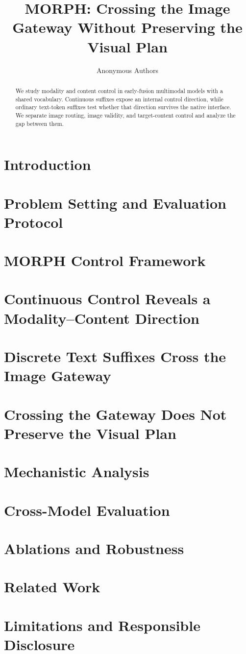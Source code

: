 \documentclass{article}
\title{MORPH: Crossing the Image Gateway Without Preserving the Visual Plan}
\author{Anonymous Authors}
\begin{document}
\maketitle
\begin{abstract}
We study modality and content control in early-fusion multimodal models with a shared vocabulary. Continuous suffixes expose an internal control direction, while ordinary text-token suffixes test whether that direction survives the native interface. We separate image routing, image validity, and target-content control and analyze the gap between them.
\end{abstract}
\section{Introduction}
\section{Problem Setting and Evaluation Protocol}
\section{MORPH Control Framework}
\section{Continuous Control Reveals a Modality--Content Direction}
\section{Discrete Text Suffixes Cross the Image Gateway}
\section{Crossing the Gateway Does Not Preserve the Visual Plan}
\section{Mechanistic Analysis}
\section{Cross-Model Evaluation}
\section{Ablations and Robustness}
\section{Related Work}
\section{Limitations and Responsible Disclosure}


\end{document}
